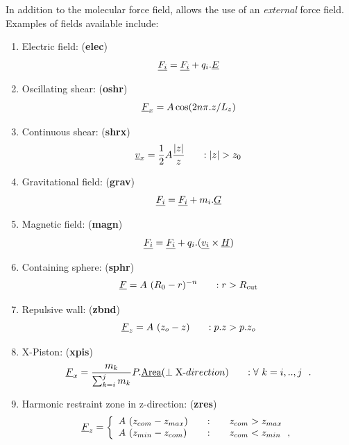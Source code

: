 In addition to the molecular force field, \D allows the use of an
{\em external} force field.  Examples of fields
available include:
\begin{enumerate}
\item Electric field:  ({\bf elec})
\begin{equation}
\mbox{$\underline{F_{i}}$} = \mbox{$\underline{F_{i}}$} + q_{i} . \mbox{$\underline{E}$}
\end {equation}
\item Oscillating shear:  ({\bf oshr})
\begin{equation}
\mbox{$\underline{F}$}_{x} =A \cos(2n \pi . z/L_{z})
\end{equation}
\item Continuous shear:  ({\bf shrx})
\begin{equation}
\vek{v}_{x} = \frac{1}{2} A \frac{|z|}{z}~~~~~:|z|>z_{0}
\end{equation}
\item Gravitational field:  ({\bf grav})
\begin{equation}
\mbox{$\underline{F_{i}}$} = \mbox{$\underline{F_{i}}$} + m_{i} . \mbox{$\underline{G}$}
\end {equation}
\item Magnetic field:  ({\bf magn})
\begin{equation}
\mbox{$\underline{F_{i}}$} = \mbox{$\underline{F_{i}}$} + q_{i} . (\mbox{$\underline{v_{i}}$} \times \mbox{$\underline{H}$})
\end {equation}
\item Containing sphere:  ({\bf sphr})
\begin{equation}
\mbox{$\underline{F}$}=A~(R_{0}-r)^{-n}~~~~~: r>R_{\rm cut}
\end{equation}
\item Repulsive wall:  ({\bf zbnd})
\begin{equation}
\mbox{$\underline{F}$}_{z}=A~(z_{o}-z)~~~~~: p . z > p . z_{o}
\end{equation}
\item X-Piston:  ({\bf xpis})
\begin{equation}
\mbox{$\underline{F}$}_{x} = \frac{m_{k}}{\sum_{k=i}^{j}m_{k}}
P . \mbox{$\underline{\textrm{Area}}$}(\perp\textrm{X-}direction)~~~~~: \forall~k=i,..,j~~.
\end{equation}
\item Harmonic restraint zone in z-direction: ({\bf zres})
\begin{equation}
\vek{F}_{z} = \left\{ \begin{array} {l@{\qquad:\qquad}l}
A~(z_{com}-z_{max}) & z_{com} > z_{max} \\
A~(z_{min}-z_{com}) & z_{com} < z_{min}~~,
\end{array} \right.

\end{equation}
\end{enumerate}
